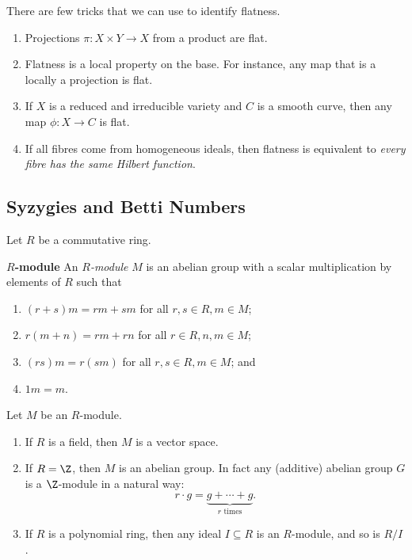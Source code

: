 \documentclass[co439]{subfiles}
\begin{document}
    \np There are few tricks that we can use to identify flatness.
    \begin{enumerate}
        \item Projections $\pi:X\times Y\to X$ from a product are flat.
        \item Flatness is a local property on the base. For instance, any map that is a locally a projection is flat.
        \item If $X$ is a reduced and irreducible variety and $C$ is a smooth curve, then any map $\phi:X\to C$ is flat.
        \item If all fibres come from homogeneous ideals, then flatness is equivalent to \textit{every fibre has the same Hilbert function}.
    \end{enumerate}

    \subsection{Syzygies and Betti Numbers}

    Let $R$ be a commutative ring.

    \begin{definition}{\textbf{$R$-module}}
        An \emph{$R$-module} $M$ is an abelian group with a scalar multiplication by elements of $R$ such that
        \begin{enumerate}
            \item $\left( r+s \right)m = rm + sm$ for all $r,s\in R, m\in M$;
            \item $r\left( m+n \right) = rm + rn$ for all $r\in R, n,m\in M$; 
            \item $\left( rs \right)m = r\left( sm \right)$ for all $r,s\in R, m\in M$; and
            \item $1m = m$.
        \end{enumerate}
    \end{definition}

    \begin{example}{}
        Let $M$ be an $R$-module.
        \begin{enumerate}
            \item If $R$ is a field, then $M$ is a vector space.
            \item If $R=\Z$, then $M$ is an abelian group. In fact any (additive) abelian group $G$ is a $\Z$-module in a natural way:
                \begin{equation*}
                    r\cdot g = \underbrace{g+\cdots+g}_{r\text{ times}}.
                \end{equation*}
            \item If $R$ is a polynomial ring, then any ideal $I\subseteq R$ is an $R$-module, and so is $R /I$.
        \end{enumerate}
    \end{example}
\end{document}
